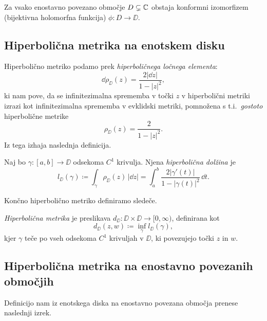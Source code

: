 \begin{izrek}
    Za vsako enostavno povezano območje \(D \subsetneq \mathbb C\) obstaja konformni izomorfizem (bijektivna holomorfna funkcija) \(\phi \colon D \to \DD\).
\end{izrek}

\subsection{Hiperbolična metrika na enotskem disku}

Hiperbolično metriko podamo prek \emph{hiperboličnega ločnega elementa}:
\[\dd \rho_{\DD} (z) = \frac{2 |\dd z|}{1 - |z|^2},\]
ki nam pove, da se infinitezimalna sprememba v točki \(z\) v hiperbolični metriki izrazi kot infinitezimalna sprememba v evklidski metriki, pomnožena s t.i.~\emph{gostoto} hiperbolične metrike
\[\rho_{\DD} (z) = \frac{2}{1 - |z|^2}.\]
Iz tega izhaja naslednja definicija.

\begin{definicija}
    Naj bo \(\gamma \colon [a, b] \to \DD\) odsekoma \(C^1\) krivulja. Njena \emph{hiperbolična dolžina} je
    \[l_{\DD} (\gamma) \coloneq \int_{\gamma} \rho_{\DD} (z) \, | \dd z | = \int_{a}^{b} \frac{2 | \gamma' (t) | }{1 - | \gamma (t) |^2} \, \dd t.\]
\end{definicija}

\noindent Končno hiperbolično metriko definiramo sledeče.

\begin{definicija}
    \emph{Hiperbolična metrika} je preslikava \(d_{\DD} \colon \DD \times \DD \to [0, \infty)\), definirana kot
    \[d_{\DD} (z, w) \coloneq \inf_{\gamma} l_{\DD} (\gamma),\]
    kjer \(\gamma\) teče po vseh odsekoma \(C^1\) krivuljah v \(\DD\), ki povezujejo točki \(z\) in \(w\).
\end{definicija}

\subsection{Hiperbolična metrika na enostavno povezanih območjih}

Definicijo nam iz enotskega diska na enostavno povezana območja prenese naslednji izrek.

